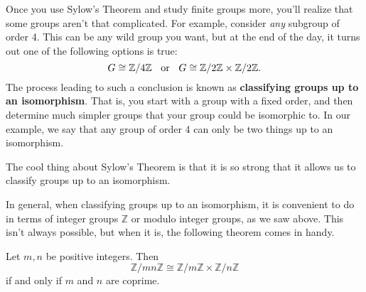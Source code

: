     Once you use Sylow's Theorem and study finite groups more, you'll
    realize that some groups aren't that complicated. For example,
    consider \textit{any} subgroup of order 4. This can be any wild
    group you want, but at the end of the day, it turns out one of the
    following options is true:
    \[
        G \cong \mathbb{Z}/4\mathbb{Z} \hspace{0.2cm}\text{ or }\hspace{.2cm} 
        G \cong \mathbb{Z}/2\mathbb{Z} \times \mathbb{Z}/2\mathbb{Z}.
    \]
    The process leading to such a conclusion is known as
    \textbf{classifying groups up to an isomorphism}. That is, you
    start with a group with a fixed order, and then determine much
    simpler groups that your group could be isomorphic to. In our
    example, we say that any group of order 4 can only be two things
    up to an isomorphism.
     
    The cool thing about Sylow's Theorem is that it is so strong that
    it allows us to classify groups up to an isomorphism. 

    In general, when classifying groups up to an isomorphism, it is
    convenient to do in terms of integer groups $\mathbb{Z}$ or
    modulo integer groups, as we saw above. This isn't always
    possible, but when it is, the following theorem comes in handy.

    \begin{thm} \label{zmod_iso_thm}
        Let $m, n$ be positive integers. Then 
        \[
            \mathbb{Z}/mn\mathbb{Z} \cong \mathbb{Z}/m\mathbb{Z} \times \mathbb{Z}/n\mathbb{Z}
        \]
        if and only if $m$ and $n$ are coprime.
    \end{thm}



